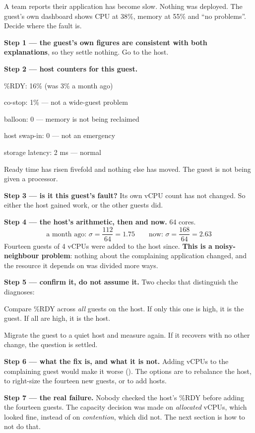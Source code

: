 \begin{worked}
A team reports their application has become slow. Nothing was deployed. The
guest's own dashboard shows CPU at 38\%, memory at 55\% and ``no problems''.
Decide where the fault is.

\smallskip
\textbf{Step 1 --- the guest's own figures are consistent with both
explanations}, so they settle nothing. Go to the host.

\smallskip
\textbf{Step 2 --- host counters for this guest.}
\begin{tight}
  \item \%RDY: 16\% (was 3\% a month ago)
  \item co-stop: 1\% --- not a wide-guest problem
  \item balloon: 0 --- memory is not being reclaimed
  \item host swap-in: 0 --- not an emergency
  \item storage latency: 2 ms --- normal
\end{tight}
Ready time has risen fivefold and nothing else has moved. The guest is not
being given a processor.

\smallskip
\textbf{Step 3 --- is it this guest's fault?} Its own vCPU count has not
changed. So either the host gained work, or the other guests did.

\smallskip
\textbf{Step 4 --- the host's arithmetic, then and now.} 64 cores.
\[ \text{a month ago: } \sigma = \frac{112}{64} = 1.75 \qquad
   \text{now: } \sigma = \frac{168}{64} = \mathbf{2.63} \]
Fourteen guests of 4 vCPUs were added to the host since. \textbf{This is a
noisy-neighbour problem}: nothing about the complaining application changed,
and the resource it depends on was divided more ways.

\smallskip
\textbf{Step 5 --- confirm it, do not assume it.} Two checks that distinguish
the diagnoses:
\begin{tight}
  \item Compare \%RDY across \emph{all} guests on the host. If only this one is
        high, it is the guest. If all are high, it is the host.
  \item Migrate the guest to a quiet host and measure again. If it recovers
        with no other change, the question is settled.
\end{tight}

\smallskip
\textbf{Step 6 --- what the fix is, and what it is not.} Adding vCPUs to the
complaining guest would make it worse (). The options are to
rebalance the host, to right-size the fourteen new guests, or to add hosts.

\smallskip
\textbf{Step 7 --- the real failure.} Nobody checked the host's \%RDY before
adding the fourteen guests. The capacity decision was made on \emph{allocated}
vCPUs, which looked fine, instead of on \emph{contention}, which did not. The
next section is how to not do that.
\end{worked}

